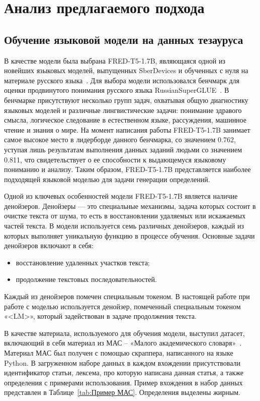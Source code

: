 \documentclass[LI,VKR]{HSEUniversity}
\begin{document}
\chapter{Анализ предлагаемого подхода}

\section{Обучение языковой модели на данных тезауруса}

В качестве модели была выбрана FRED-T5-1.7B, являющаяся одной из новейших языковых моделей,
выпущенных SberDevices и обученных с нуля на материале русского языка~\cite{FRED-T5}.
Для выбора модели использовался бенчмарк для оценки продвинутого понимания русского языка
RussianSuperGLUE~\cite{RussianSuperGLUE}.
В бенчмарке присутствуют несколько групп задач, охватывая
общую диагностику языковых моделей и различные лингвистические задачи:
понимание здравого смысла, логическое следование в естественном языке,
рассуждения, машинное чтение и знания о мире.
На момент написания работы FRED-T5-1.7B занимает самое высокое место в лидерборде данного бенчмарка,
со значением 0.762,
уступая лишь результатам выполнения данных заданий людьми со значением 0.811,
что свидетельствует о ее способности к выдающемуся языковому пониманию и анализу.
Таким образом, FRED-T5-1.7B представляется наиболее подходящей языковой моделью
для задачи генерации определений.

Одной из ключевых особенностей модели FRED-T5-1.7B является наличие денойзеров.
Денойзеры — это специальные механизмы, задача которых состоит в очистке текста от шума,
то есть в восстановлении удаляемых или искажаемых частей текста.
В модели используется семь различных денойзеров, каждый из которых выполняет
уникальную функцию в процессе обучения.
Основные задачи денойзеров включают в себя:
\begin{itemize}
    \item восстановление удаленных участков текста;
    \item продолжение текстовых последовательностей.
\end{itemize}

Каждый из денойзеров помечен специальным токеном.
В настоящей работе при работе с моделью используется денойзер,
помеченный специальным токеном «<LM>»,
который задействован в задаче продолжения текста.

В качестве материала, используемого для обучения модели, выступил датасет,
включающий в себя материал из МАС – «Малого академического словаря»~\cite{MAS1981}.
Материал МАС был получен с помощью скраппера, написанного на языке Python.
В загруженном наборе данных в каждом вхождении присутствовали
идентификатор статьи, лексема, про которую написана данная статья, а также определения
с примерами использования.
Пример вхождения в набор данных представлен в Таблице~\ref{tab:Пример МАС}.
Определения выделены жирным.
\end{document}
